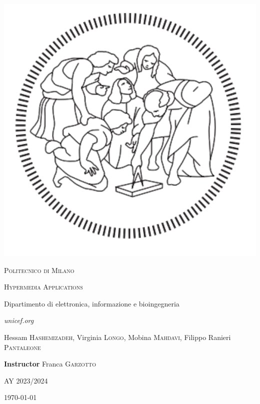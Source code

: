 \begin{titlepage}

\thispagestyle{empty}
\setlength\headheight{0pt}
\begin{center}

\begin{center}
\includegraphics[width=0.25\linewidth]{img/polimi.png}
\end{center}


        {\scshape\LARGE Politecnico di Milano  \par}
        \vspace{2.5cm}
        {\scshape\Large Hypermedia Applications \par}
        Dipartimento di elettronica, informazione e bioingegneria\\
        \vspace{1cm}
        \begin{center}
		\end{center}
        {\Large\itshape unicef.org\par}
        \vspace{1cm}

\begin{center}
		\normalsize Hessam \textsc{Hashemizadeh}, Virginia \textsc{Longo}, Mobina \textsc{Mahdavi}, Filippo Ranieri \textsc{Pantaleone}
\end{center}

\begin{center}
		\footnotesize \textbf{Instructor} Franca \textsc{Garzotto}
\end{center}

\vspace{1cm}
{\Large AY 2023/2024\par}
\vspace{0.5cm}
\large
\today

\end{center}

\clearpage
\restoregeometry
\end{titlepage}
